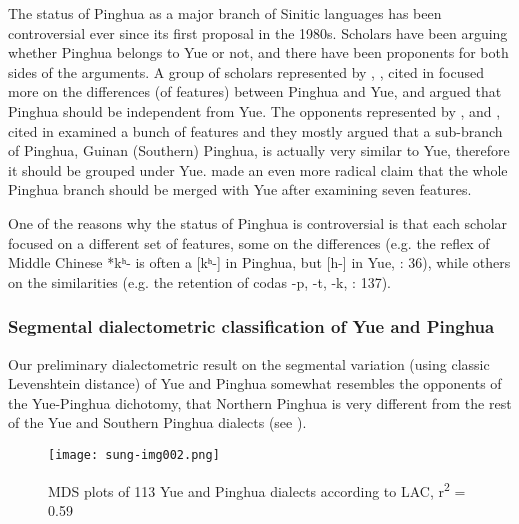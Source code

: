 \documentclass[output=paper, chinesefont]{langscibook}
\begin{document}
The status of Pinghua as a major branch of Sinitic languages has been controversial ever since its first proposal in the 1980s. Scholars have been arguing whether Pinghua belongs to Yue or not, and there have been proponents for both sides of the arguments. A group of scholars represented by \citet{LiangZhang1999}, \citet{Wei1996}, \citet{Li2000} cited in \citet{Tan2012} focused more on the differences (of features) between Pinghua and Yue, and argued that Pinghua should be independent from Yue. The opponents represented by \citet{Wu2001}, \citet{Tan2000} and \citet{Liang1997}, cited in \citet{Tan2012} examined a bunch of features and they mostly argued that a sub-branch of Pinghua, Guinan (Southern) Pinghua, is actually very similar to Yue, therefore it should be grouped under Yue. \citet{Liang1997} made an even more radical claim that the whole Pinghua branch should be merged with Yue after examining seven features.

One of the reasons why the status of Pinghua is controversial is that each scholar focused on a different set of features, some on the differences (e.g.  the reflex of Middle Chinese *kʰ{}- is often a [kʰ{}-] in Pinghua, but [h-] in Yue, \citet{Li2000}: 36), while others on the similarities (e.g. the retention of codas -p, -t, -k, \citet{Wu2001}: 137). 

\subsubsection{Segmental dialectometric classification of Yue and Pinghua}
\label{sec:sung:4.1.2}
Our preliminary dialectometric result on the segmental variation (using classic Levenshtein distance) of Yue and Pinghua somewhat resembles the opponents of the Yue-Pinghua dichotomy, that Northern Pinghua is very different from the rest of the Yue and Southern Pinghua dialects (see ). 

   
\begin{figure}
\texttt{[image: sung-img002.png]}
\caption{MDS plots of 113 Yue and Pinghua dialects according to LAC, r\textsuperscript{2} = 0.59}
\label{fig:sung:2}
\end{figure}
\end{document}
